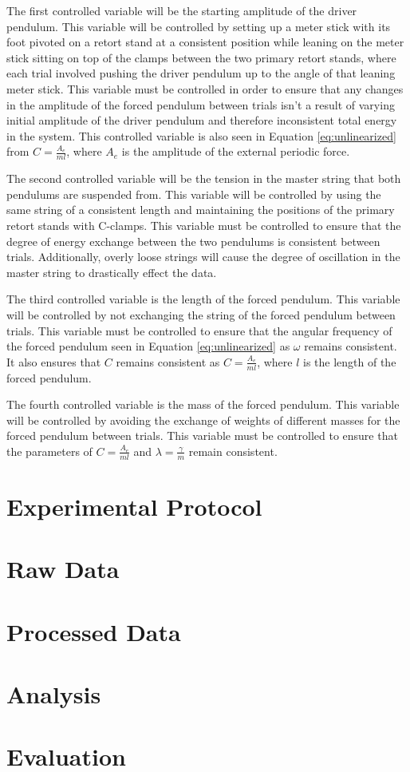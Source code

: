 \documentclass[letterpaper, 12pt]{article}
\begin{document}
The first controlled variable will be the starting amplitude of the
driver pendulum. This variable will be controlled by setting up a
meter stick with its foot pivoted on a retort stand at a
consistent position while leaning on the meter stick
sitting on top of the clamps between the two primary retort
stands, where each trial involved pushing the driver pendulum up to the
angle of that leaning meter stick. This variable must be controlled in
order to ensure that any changes in the amplitude of the forced
pendulum between trials isn't a result of varying
initial amplitude of the
driver pendulum and therefore inconsistent total energy in the system.
This controlled variable is also seen in Equation \ref*{eq:unlinearized}
from \(C = \frac{A_e}{ml}\), where \(A_e\) is the
amplitude of the external periodic force.

The second controlled variable will be the tension in the
master string that both pendulums are suspended from. This variable
will be controlled by using the same string of a consistent length
and maintaining the positions of the primary retort
stands with C-clamps. This variable must be controlled to
ensure that the degree of energy exchange between the
two pendulums is consistent between trials. Additionally,
overly loose strings will cause the degree of oscillation
in the master string to drastically effect the data.

The third controlled variable is the length of the
forced pendulum. This variable will be controlled by not
exchanging the string of the forced pendulum between trials.
This variable must be controlled to ensure that the
angular frequency of the forced pendulum seen
in Equation \ref*{eq:unlinearized} as \(\omega\)
remains consistent. It also ensures that \(C\)
remains consistent as \(C = \frac{A_e}{ml}\),
where \(l\) is the length of the forced pendulum.

The fourth controlled variable is the mass of
the forced pendulum. This variable will be controlled by
avoiding the exchange of weights of different
masses for the forced pendulum between trials.
This variable must be controlled to
ensure that the parameters of \(C = \frac{A_e}{ml}\)
and \(\lambda = \frac{\gamma}{m}\) remain consistent.

\section{Experimental Protocol}

\section{Raw Data}

\section{Processed Data}

\section{Analysis}

\section{Evaluation}



\end{document}
